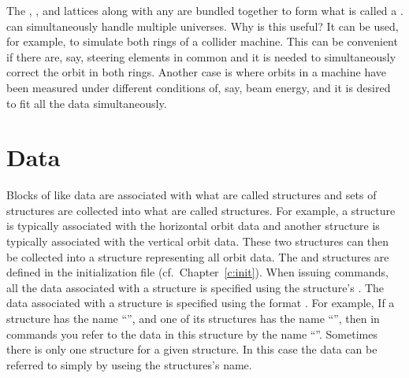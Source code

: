 The , , and  lattices along with any
 are bundled together to form what is called a
. \tao can simultaneously handle multiple universes. Why
is this useful? It can be used, for example, to simulate both rings of
a collider machine. This can be convenient if there are, say, steering
elements in common and it is needed to simultaneously correct the
orbit in both rings. Another case is where orbits in a machine have
been measured under different conditions of, say, beam energy, and it
is desired to fit all the data simultaneously.

\section{Data}

Blocks of like data are associated with what are called 
structures and sets of  structures are collected into what
are called  structures. For example, a 
structure is typically associated with the horizontal orbit data and
another  structure is typically associated with the
vertical orbit data. These two structures can then be collected into a
 structure representing all orbit data. The 
and  structures are defined in the \tao initialization
file (cf.~Chapter~\ref{c:init}).  When issuing \tao commands, all the
data associated with a  structure is specified using the
 structure's .  The data associated with a
 structure is specified using the format
. For example, If a  structure has the
name ``'', and one of its  structures has the name
``'', then in \tao commands you refer to the data in this
 structure by the name ``''. Sometimes there is
only one  structure for a given  structure. In
this case the data can be referred to simply by useing the
 structures's name.

